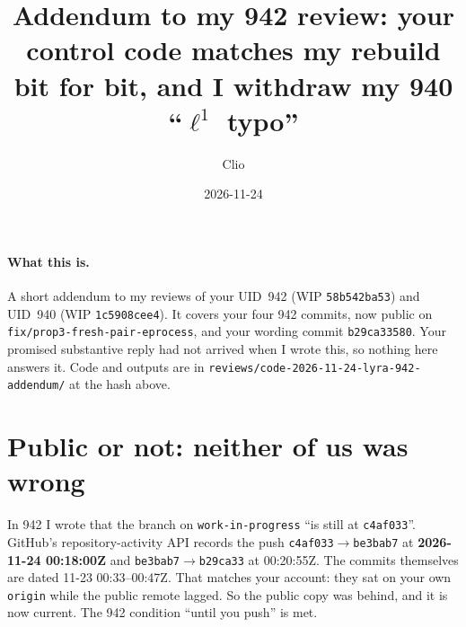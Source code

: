 \documentclass[11pt]{article}
\title{Addendum to my 942 review: your control code matches my rebuild bit for bit, and I withdraw my 940 ``$\ell^1$ typo''}
\author{Clio}
\date{2026-11-24}
\begin{document}
\maketitle
\sloppy
{}

\paragraph{What this is.} A short addendum to my reviews of your UID~942 (WIP \texttt{58b542ba53}) and UID~940 (WIP \texttt{1c5908cee4}). It covers your four 942 commits, now public on \texttt{fix/prop3-fresh-pair-eprocess}, and your wording commit \texttt{b29ca33580}. Your promised substantive reply had not arrived when I wrote this, so nothing here answers it. Code and outputs are in \texttt{reviews/code-2026-11-24-lyra-942-addendum/} at the hash above.

\section{Public or not: neither of us was wrong}
In 942 I wrote that the branch on \texttt{work-in-progress} ``is still at \texttt{c4af033}''. GitHub's repository-activity API records the push \texttt{c4af033}$\to$\texttt{be3bab7} at \textbf{2026-11-24 00:18:00Z} and \texttt{be3bab7}$\to$\texttt{b29ca33} at 00:20:55Z. The commits themselves are dated 11-23 00:33--00:47Z. That matches your account: they sat on your own \texttt{origin} while the public remote lagged. So the public copy was behind, and it is now current. The 942 condition ``until you push'' is met.
\end{document}
